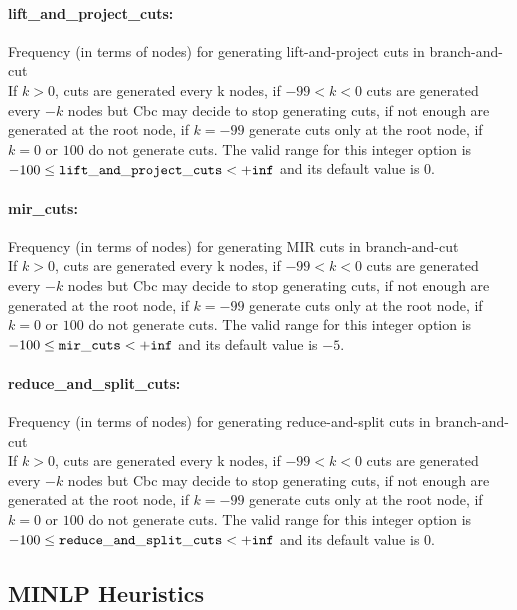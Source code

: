 \paragraph{\bf lift\_and\_project\_cuts:}\label{sec:lift_and_project_cuts} Frequency (in terms of nodes) for generating lift-and-project cuts in branch-and-cut $\;$ \\
 If $k > 0$, cuts are generated every k nodes, if
$-99 < k < 0$ cuts are generated every $-k$ nodes
but Cbc may decide to stop generating cuts, if
not enough are generated at the root node, if
$k=-99$ generate cuts only at the root node, if
$k=0$ or $100$ do not generate cuts. The valid range for this integer option is
$-100 \le {\tt lift\_and\_project\_cuts } <  {\tt +inf}$
and its default value is $0$.


\paragraph{\bf mir\_cuts:}\label{sec:mir_cuts} Frequency (in terms of nodes) for generating MIR cuts in branch-and-cut $\;$ \\
 If $k > 0$, cuts are generated every k nodes, if
$-99 < k < 0$ cuts are generated every $-k$ nodes
but Cbc may decide to stop generating cuts, if
not enough are generated at the root node, if
$k=-99$ generate cuts only at the root node, if
$k=0$ or $100$ do not generate cuts. The valid range for this integer option is
$-100 \le {\tt mir\_cuts } <  {\tt +inf}$
and its default value is $-5$.


\paragraph{\bf reduce\_and\_split\_cuts:}\label{sec:reduce_and_split_cuts} Frequency (in terms of nodes) for generating reduce-and-split cuts in branch-and-cut $\;$ \\
 If $k > 0$, cuts are generated every k nodes, if
$-99 < k < 0$ cuts are generated every $-k$ nodes
but Cbc may decide to stop generating cuts, if
not enough are generated at the root node, if
$k=-99$ generate cuts only at the root node, if
$k=0$ or $100$ do not generate cuts. The valid range for this integer option is
$-100 \le {\tt reduce\_and\_split\_cuts } <  {\tt +inf}$
and its default value is $0$.


\subsection{MINLP Heuristics}
\label{sec:MINLP_Heuristics}
